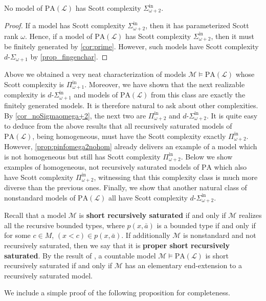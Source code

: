 \documentclass[11pt]{amsart}
\newcommand{\mc}[1]{\mathcal{#1}}
\newcommand{\Pinf}[1]{\Pi^{\mathrm{in}}_{#1}}
\newcommand{\Sinf}[1]{\Sigma^{\mathrm{in}}_{#1}}
\newcommand{\dSinf}[1]{d\text{-}\Sigma^{\mathrm{in}}_{#1}}
\newcommand{\PA}{\mathrm{PA}}
\theoremstyle{remark}
\newcommand{\define}[1]{\textbf{#1}}
\begin{document}
\begin{corollary}\label{cor_noSigmaomega+2}
    No model of $\PA(\mathcal{L})$ has Scott complexity $\Sinf{\omega+2}$.
\end{corollary}
\begin{proof}
	If a model has Scott complexity $\Sinf{\omega+2}$, then it has parameterized Scott rank $\omega$. Hence, if a model of $\PA(\mathcal{L})$ has Scott complexity $\Sinf{\omega+2}$, then it must be finitely generated by  \cref{cor:prime}. However, such models have Scott complexity $d\text{-}\Sigma_{\omega+1}$ by \cref{prop_fingenchar}.
\end{proof}

Above we obtained a very neat characterization of models $\mc{M}\models\PA(\mathcal{L})$ whose Scott complexity is $\Pinf{\omega+1}$. Moreover, we have shown that the next realizable complexity is $\dSinf{\omega+1}$ and models of $\PA(\mathcal{L})$ from this class are exactly the finitely generated models. It is therefore natural to ask about other complexities. By \cref{cor_noSigmaomega+2}, the next two are $\Pinf{\omega+2}$ and $\dSinf{\omega+2}$. It is quite easy to deduce from the above results that all recursively saturated models of $\PA(\mathcal{L})$, being homogeneous, must have the Scott complexity exactly $\Pinf{\omega+2}$. However, \cref{prop:pinfomega2nohom} already delivers an example of a model which is not homogeneous but still has Scott complexity $\Pinf{\omega+2}.$ Below we show examples of homogeneous, not recursively saturated models of $\PA$ which also have Scott complexity $\Pinf{\omega+2}$, witnessing that this complexity class is much more diverse than the previous ones. Finally, we show that another natural class of nonstandard models of $\PA(\mathcal{L})$ all have Scott complexity $\dSinf{\omega+2}$.

Recall that a model $\mc{M}$ is \define{short recursively saturated} if and only if $\mc{M}$ realizes all the recursive bounded types, where $p(x,\bar{a})$ is a bounded type if and only if for some $c\in M$, $(x<c)\in p(x,\bar{a})$. If additionally $\mc{M}$ is nonstandard and not recursively saturated, then we say that it is \define{proper short recursively saturated}. By the result of \cite[Theorem 2.8]{Smor1981}, a countable model $\mc{M}\models \PA(\mathcal{L})$ is short recursively saturated if and only if $\mc{M}$ has an elementary end-extension to a recursively saturated model. 

We include a simple proof of the following proposition for completeness.
\end{document}
